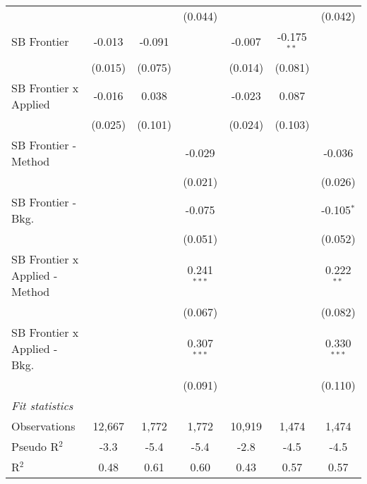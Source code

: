 \begin{tabular}{lcccccc}
                                  &             &         & (0.044)        &              &               & (0.042)\\   
   SB Frontier                    & -0.013      & -0.091  &                & -0.007       & -0.175$^{**}$ &   \\   
                                  & (0.015)     & (0.075) &                & (0.014)      & (0.081)       &   \\   
   SB Frontier x Applied          & -0.016      & 0.038   &                & -0.023       & 0.087         &   \\   
                                  & (0.025)     & (0.101) &                & (0.024)      & (0.103)       &   \\   
   SB Frontier - Method           &             &         & -0.029         &              &               & -0.036\\   
                                  &             &         & (0.021)        &              &               & (0.026)\\   
   SB Frontier - Bkg.             &             &         & -0.075         &              &               & -0.105$^{*}$\\   
                                  &             &         & (0.051)        &              &               & (0.052)\\   
   SB Frontier x Applied - Method &             &         & 0.241$^{***}$  &              &               & 0.222$^{**}$\\   
                                  &             &         & (0.067)        &              &               & (0.082)\\   
   SB Frontier x Applied - Bkg.   &             &         & 0.307$^{***}$  &              &               & 0.330$^{***}$\\   
                                  &             &         & (0.091)        &              &               & (0.110)\\   
   \midrule
   \emph{Fit statistics}\\
   Observations                   & 12,667      & 1,772   & 1,772          & 10,919       & 1,474         & 1,474\\  
   Pseudo R$^2$                   & -3.3        & -5.4    & -5.4           & -2.8         & -4.5          & -4.5\\  
   R$^2$                          & 0.48        & 0.61    & 0.60           & 0.43         & 0.57          & 0.57\\  
   

\end{tabular}
